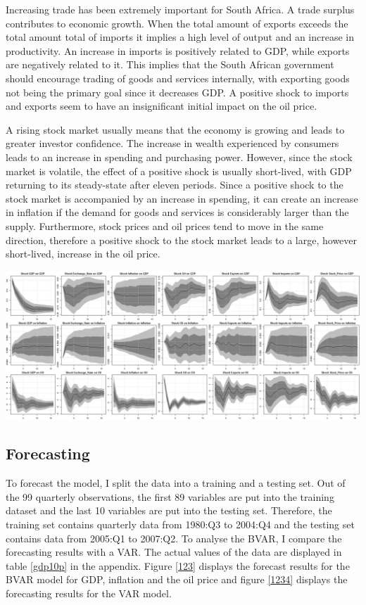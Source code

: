 \documentclass[11pt,preprint, authoryear]{elsarticle}
\let\origfigure\figure
\let\endorigfigure\endfigure
\renewenvironment{figure}[1][2] {
    \expandafter\origfigure\expandafter[H]
} {
    \endorigfigure
}
\numberwithin{equation}{section}
\numberwithin{figure}{section}
\numberwithin{table}{section}
\begin{document}
Increasing trade has been extremely important for South Africa. A trade
surplus contributes to economic growth. When the total amount of exports
exceeds the total amount total of imports it implies a high level of
output and an increase in productivity. An increase in imports is
positively related to GDP, while exports are negatively related to it.
This implies that the South African government should encourage trading
of goods and services internally, with exporting goods not being the
primary goal since it decreases GDP. A positive shock to imports and
exports seem to have an insignificant initial impact on the oil price.

A rising stock market usually means that the economy is growing and
leads to greater investor confidence. The increase in wealth experienced
by consumers leads to an increase in spending and purchasing power.
However, since the stock market is volatile, the effect of a positive
shock is usually short-lived, with GDP returning to its steady-state
after eleven periods. Since a positive shock to the stock market is
accompanied by an increase in spending, it can create an increase in
inflation if the demand for goods and services is considerably larger
than the supply. Furthermore, stock prices and oil prices tend to move
in the same direction, therefore a positive shock to the stock market
leads to a large, however short-lived, increase in the oil price.

\begin{figure}[h]
\centering
\includegraphics[scale = 0.45, angle = 90]{use_shocks.jpg}
\caption{Impulse Response Functions}
\label{irf}
\end{figure}

\hypertarget{forecasting}{%
\subsection{Forecasting}\label{forecasting}}

To forecast the model, I split the data into a training and a testing
set. Out of the 99 quarterly observations, the first 89 variables are
put into the training dataset and the last 10 variables are put into the
testing set. Therefore, the training set contains quarterly data from
1980:Q3 to 2004:Q4 and the testing set contains data from 2005:Q1 to
2007:Q2. To analyse the BVAR, I compare the forecasting results with a
VAR. The actual values of the data are displayed in table \ref{gdp10p}
in the appendix. Figure \ref{123} displays the forecast results for the
BVAR model for GDP, inflation and the oil price and figure \ref{1234}
displays the forecasting results for the VAR model.
\end{document}
